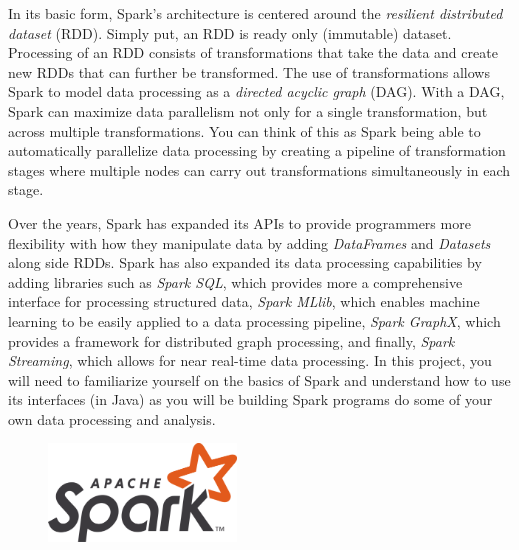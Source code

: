 \documentclass{article}
\begin{document}
In its basic form, Spark's architecture is centered around the \textit{resilient distributed dataset} (RDD). Simply put, an RDD is ready only (immutable) dataset. Processing of an RDD consists of transformations that take the data and create new RDDs that can further be transformed. The use of transformations allows Spark to model data processing as a \textit{directed acyclic graph} (DAG). With a DAG, Spark can maximize data parallelism not only for a single transformation, but across multiple transformations. You can think of this as Spark being able to automatically parallelize data processing by creating a pipeline of transformation stages where multiple nodes can carry out transformations simultaneously in each stage. 

Over the years, Spark has expanded its APIs to provide programmers more flexibility with how they manipulate data by adding \textit{DataFrames} and \textit{Datasets} along side RDDs. Spark has also expanded its data processing capabilities by adding libraries such as \textit{Spark SQL}, which provides more a comprehensive interface for processing structured data, \textit{Spark MLlib}, which enables machine learning to be easily applied to a data processing pipeline, \textit{Spark GraphX}, which provides a framework for distributed graph processing, and finally, \textit{Spark Streaming}, which allows for near real-time data processing. In this project, you will need to familiarize yourself on the basics of Spark and understand how to use its interfaces (in Java) as you will be building Spark programs do some of your own data processing and analysis.

\begin{figure}[hbt!]
\vspace{-0.1cm}
\centering
\includegraphics[width=5cm]{images/Apache_Spark_logo.png}
\vspace{-0.4cm}
\end{figure}
\end{document}
